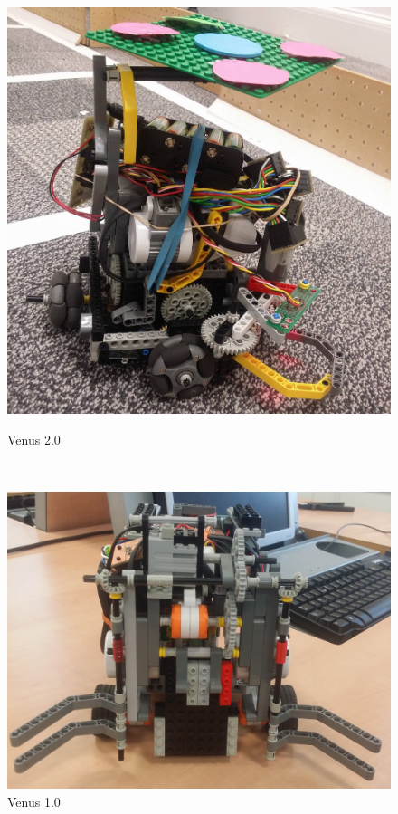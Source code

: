 \documentclass[a4paper,12pt]{article}
\begin{document}
\begin{figure}[ht]
	\begin{minipage}[b]{.405\textwidth}
        \centering
		\includegraphics[scale=0.133]{venus3.jpg}
		\caption{Venus 2.0}
		\label{fig:new}
	\end{minipage}
	~
	\begin{minipage}[b]{.59\textwidth}
        \centering
		\includegraphics[scale=0.0845]{grab_open1.jpg}
		\caption{Venus 1.0}
		\label{fig:old}
	\end{minipage}
\end{figure}
\end{document}
